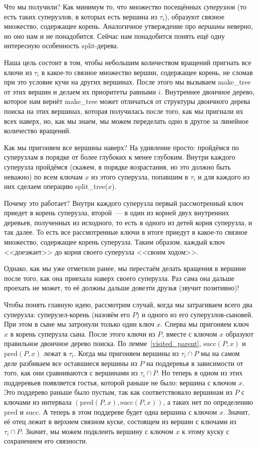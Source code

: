 Что мы получили? Как минимум то, что множество посещённых \emph{суперузлов} (то есть таких суперузлов, в которых есть вершина из $\tau_i$), образуют связное множество, содержащее корень. Аналогичное утверждение про \emph{вершины} неверно, но оно нам и не понадобится. Сейчас нам понадобится понять ещё одну интересную особенность split-дерева.

Наша цель состоит в том, чтобы небольшим количеством вращений пригнать все
ключи из $\tau_i$ в какое-то связное множество вершин, содержащее корень,
не сломав при это условие кучи на других вершинах.
После этого мы вызываем \textrm{make\_tree} от этих вершин и делаем их приоритеты
равными $i$. Внутреннее двоичное дерево, которое нам вернёт \textrm{make\_tree}
может отличаться от структуры двоичного дерева поиска на этих вершинах, которая получилась после того, как мы пригнали их всех наверх, но, как мы знаем, мы можем переделать одно в другое за линейное количество вращений.

Как мы пригоняем все вершины наверх? На удивление просто: пройдёмся по суперузлам в порядке от более глубоких к менее глубоким. Внутри каждого суперузла пройдёмся (скажем, в порядке возрастания, но это должно быть неважно) по всем ключам $x$ из этого суперузла, попавшим в $\tau_i$ и для каждого из них сделаем операцию
\textrm{split\_tree}($x$).

Почему это работает? Внутри каждого суперузла первый рассмотренный ключ приедет в корень суперузла, второй~--- в один из корней двух внутренних деревьев, полученных из исходного, то есть в одного из детей корня суперузла, и так далее. То есть все рассмотренные ключи в итоге приедут в какое-то связное множество, содержащее корень суперузла. Таким образом, каждый ключ <<доезжает>> до корня своего суперузла <<своим ходом>>.

Однако, как мы уже отметили ранее, мы перестаём делать вращения в вершине после того, как она приехала наверх своего суперузла. Раз сама она дальше проехать не может, то её должны
дальше довезти друзья (звучит позитивно)!

Чтобы понять главную идею, рассмотрим случай, когда мы затрагиваем всего два суперузла: суперузел-корень (назовём его $P$) и одного из его суперузлов-сыновей. При этом в сыне мы затронули только один ключ $x$. Сперва мы пригоняем ключ $x$ в корень суперузла сына.
После этого ключи из $P$, вместе с ключом $x$ образуют правильное двоичное дерево поиска.
По лемме~\ref{visited_parent}, $\mathrm{succ}(P, x)$ и $\mathrm{pred}(P, x)$ лежат в $\tau_i$. Когда мы пригоняем вершины из $\tau_i \cap P$ мы на самом деле разбиваем все оставшиеся вершины из $P$ на поддеревья в зависимости от того, как они сравниваются с вершинами из $\tau_i \cap P$. Но теперь в одном из этих поддеревьев появляется гостья, которой раньше не было: вершина с ключом $x$. Это поддерево раньше было пустым, так как соответствовало вершинам из $P$ с ключами из интервала $(\mathrm{pred}(P, x), \mathrm{succ}(P, x))$, а таких нет по определению $\mathrm{pred}$ и $\mathrm{succ}$. А теперь в этом поддереве будет одна вершина с ключом $x$. Значит, её отец лежит в верхнем связном куске, состоящем из вершин с ключами из $\tau_i \cap P$. Значит, мы можем подклеить вершину с ключом $x$ к этому куску с сохранением его связности.

